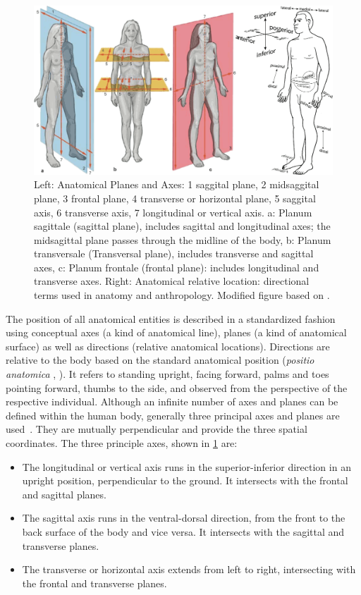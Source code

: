 \documentclass[sw]{iosart2x}
\begin{document}
\begin{figure}
\includegraphics[width=\textwidth]{img/axisplanelocation.png}
\caption{Left: Anatomical Planes and Axes:
1 saggital plane,
2 midsaggital plane,
3 frontal plane,
4 transverse or horizontal plane,
5 saggital axis,
6 transverse axis,
7 longitudinal or vertical axis.
a: Planum sagittale (sagittal plane), includes sagittal and longitudinal axes; the midsagittal plane passes through the midline of the body,
b: Planum transversale (Transversal plane), includes transverse and sagittal axes,
c: Planum frontale (frontal plane): includes longitudinal and transverse axes.
Right: Anatomical relative location: directional terms used in anatomy and anthropology.
Modified figure based on \cite{allgemeineanatomieen,schemamann}.}
\label{fig:axisplane}
\end{figure}
The position of all anatomical entities is described in a standardized fashion using conceptual axes (a kind of anatomical line), planes (a kind of anatomical surface) as well as directions (relative anatomical locations).
Directions are relative to the body based on the standard anatomical position (\emph{positio anatomica} , ).
It refers to standing upright, facing forward, palms and toes pointing forward, thumbs to the side, and observed from the perspective of the respective individual. %
%
Although an infinite number of axes and planes can be defined within the human body, generally three principal axes and planes are used~\citep{prometheus}.
They are mutually perpendicular and provide the three spatial coordinates.
The three principle axes, shown in \cref{fig:axisplane} are:
\begin{itemize}
\item The longitudinal or vertical axis runs in the superior-inferior direction in an upright position, perpendicular to the ground.
It intersects with the frontal and sagittal planes.
\item The sagittal axis runs in the ventral-dorsal direction, from the front to the back surface of the body and vice versa.
It intersects with the sagittal and transverse planes.
\item The transverse or horizontal axis extends from left to right, intersecting with the frontal and transverse planes.
\end{itemize}
\end{document}
